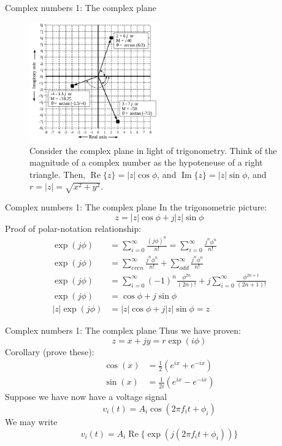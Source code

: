 \documentclass{beamer}
\begin{document}
\begin{frame}{Complex numbers 1: The complex plane}
\begin{figure}
\centering
\includegraphics[width=0.5\textwidth]{figures/plane2.png}
\caption{\label{fig:complex5} Consider the complex plane in light of trigonometry.  Think of the magnitude of a complex number as the hypoteneuse of a right triangle.  Then, $\operatorname{Re}\lbrace z \rbrace = |z|\cos\phi$, and $\operatorname{Im}\lbrace z \rbrace = |z|\sin\phi$, and $r = |z| = \sqrt{x^2+y^2}$.}
\end{figure}
\end{frame}

\begin{frame}{Complex numbers 1: The complex plane}
\small
In the trigonometric picture:
\begin{equation}
z = |z| \cos\phi + j |z| \sin\phi
\end{equation}
Proof of polar-notation relationship:
\begin{align}
\exp(j\phi) &= \sum_{i=0}^{\infty} \frac{(j\phi)^n}{n!} = \sum_{i=0}^{\infty} \frac{j^n\phi^n}{n!} \\
\exp(j\phi) &= \sum_{even}^{\infty} \frac{j^n\phi^n}{n!} + \sum_{odd}^{\infty} \frac{j^n\phi^n}{n!} \\
\exp(j\phi) &= \sum_{i=0}^{\infty} (-1)^n \frac{\phi^{2n}}{(2n)!} + j\sum_{i=0}^{\infty} \frac{\phi^{2n+1}}{(2n+1)!} \\
\exp(j\phi) &= \cos\phi + j\sin\phi \\
|z|\exp(j\phi) &= |z| \cos\phi + j |z| \sin\phi = z
\end{align}
\end{frame}

\begin{frame}{Complex numbers 1: The complex plane}
Thus we have proven:
\begin{equation}
\boxed{ z = x+jy = r \exp(i\phi)
}
\end{equation}
Corollary (prove these):
\begin{align}
\cos(x) &= \frac{1}{2}\left(e^{ix} + e^{-ix}\right) \\
\sin(x) &= \frac{1}{2i}\left(e^{ix} - e^{-ix}\right)
\end{align}
Suppose we have now have a voltage signal
\begin{equation}
v_i(t) = A_i \cos(2\pi f_i t + \phi_i)
\end{equation}
We may write
\begin{equation}
v_i(t) = A_i \operatorname{Re}\lbrace \exp(j(2\pi f_i t + \phi_i)) \rbrace
\end{equation}
\end{frame}
\end{document}
